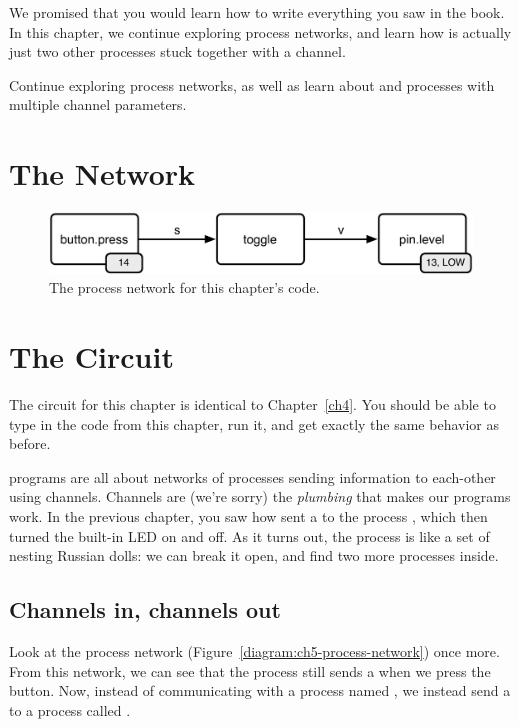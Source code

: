 We promised that you would learn how to write everything you saw in the book. In this chapter, we continue exploring process networks, and learn how \tp is actually just two other processes stuck together with a channel.

\GOALS
Continue exploring process networks, as well as learn about \LEVELT and processes with multiple channel parameters.

\section{The Network}

\begin{figure}[h]
  \begin{center}
    \includegraphics[width=\linewidth]{images/ch5-process-network}
    \caption{The process network for this chapter's code.}
    \label{diagram:ch5-process-network}
  \end{center}
\end{figure}

\CODE


\section{The Circuit}
The circuit for this chapter is identical to Chapter~\ref{ch4}. You should be able to type in the code from this chapter, run it, and get exactly the same behavior as before. 

\PATTERNS
\plumbing programs are all about networks of processes sending information to each-other using channels. Channels are (we're sorry) the {\em plumbing} that makes our programs work. In the previous chapter, you saw how \bp sent a \SIGNALV to the process \tp, which then turned the built-in LED on and off. As it turns out, the process \tp is like a set of nesting Russian dolls: we can break it open, and find two more processes inside.

\subsection{Channels in, channels out}
Look at the process network (Figure~\vref{diagram:ch5-process-network}) once more. From this network, we can see that the \bp process still sends a \SIGNALV when we press the button. Now, instead of communicating with a  process named \tp, we instead send a \SIGNALV to a process called \toggle. 

